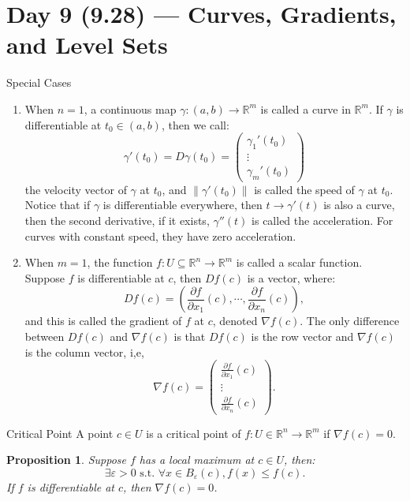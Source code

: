 \documentclass[11pt]{article}
\makeatletter
\newcounter{thmcounter}
\newenvironment{definition}[1]{\begin{defbox}{#1}{}}{\end{defbox}}
\newenvironment{example}[1]{\begin{exbox}{#1}{}}{\end{exbox}}
\theoremstyle{quiet}
\newtheorem{proposition}[thmcounter]{Proposition}
\newtheorem{proposition}[tcb@cnt@defbox]{Proposition}
\theoremstyle{quietremark}
\makeatother
\begin{document}
\newpage
\section{Day 9 (9.28) --- Curves, Gradients, and Level Sets}
\begin{example}{Special Cases}
\begin{enumerate}
\item When $n=1$, a continuous map $\gamma:(a,b)\to\mathbb{R}^m$ is called a curve in $\mathbb{R}^m$. If $\gamma$ is differentiable at $t_0\in (a,b)$, then we call:
\[
\gamma'(t_0)=D\gamma(t_0)=\begin{pmatrix}\gamma_1'(t_0)\\\vdots\\\gamma_m'(t_0)\end{pmatrix}
\]
the velocity vector of $\gamma$ at $t_0$, and $\|\gamma'(t_0)\|$ is called the speed of $\gamma$ at $t_0$. Notice that if $\gamma$ is differentiable everywhere, then $t\to \gamma'(t)$ is also a curve, then the second derivative, if it exists, $\gamma''(t)$ is called the acceleration. For curves with constant speed, they have zero acceleration.

\item When $m=1$, the function $f:U\subseteq\mathbb{R}^n\to\mathbb{R}^m$ is called a scalar function. Suppose $f$ is differentiable at $c$, then $Df(c)$ is a vector, where:
\[
Df(c)=\left(\frac{\partial f}{\partial x_1}(c),\cdots,\frac{\partial f}{\partial x_n}(c)\right), 
\]
and this is called the gradient of $f$ at $c$, denoted $\nabla f(c)$. The only difference between $Df(c)$ and $\nabla f(c)$ is that $Df(c)$ is the row vector and $\nabla f(c)$ is the column vector, i,e, 
\[
\nabla f(c)=\begin{pmatrix}\frac{\partial f}{\partial x_1}(c)\\\vdots\\\frac{\partial f}{\partial x_n}(c)\end{pmatrix}.
\]
\end{enumerate}
\end{example}

\begin{definition}{Critical Point}
A point $c\in U$ is a critical point of $f:U\in\mathbb{R}^n\to\mathbb{R}^m$ if $\nabla f(c)=0$.
\end{definition}

\begin{proposition}
Suppose $f$ has a local maximum at $c\in U$, then:
\[
\exists\varepsilon>0 \text{ s.t. }\forall x\in B_\varepsilon(c), f(x)\le f(c).
\]
If $f$ is differentiable at $c$, then $\nabla f(c)=0$.
\end{proposition}
\end{document}

